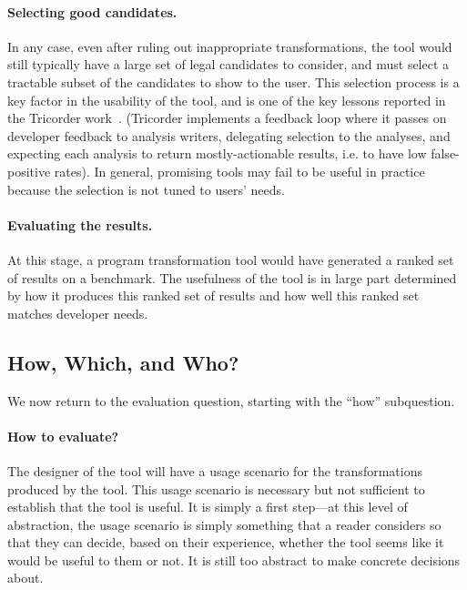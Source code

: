 \paragraph{Selecting good candidates.} In any case, even after ruling out 
inappropriate transformations, the tool would still typically have a large
set of legal candidates to consider, and must select a tractable subset of the
candidates to show to the user. This selection process is a key factor
in the usability of the tool, and is one of the key lessons reported
in the Tricorder
work~\cite{sadowski18:_lesson_build_static_analy_tools_googl}.
(Tricorder implements a feedback loop where it passes on developer feedback 
to analysis writers, delegating selection to the analyses, and
expecting each analysis to return mostly-actionable results, i.e.
to have low false-positive rates).
In general, promising tools may fail to be useful in practice because the
selection is not tuned to users' needs.

\paragraph{Evaluating the results.} At this stage, a program
transformation tool would have generated a ranked set of results on a
benchmark. The usefulness of the tool is in large part determined
by how it produces this ranked set of results and how well this ranked set
matches developer needs.

\subsection{How, Which, and Who?}
We now return to the evaluation question, starting with the ``how'' subquestion.

\paragraph{How to evaluate?} The designer of the tool will have a usage scenario for the
transformations produced by the tool. This usage scenario is necessary
but not sufficient to establish that the tool is useful. It is simply
a first step---at this level of abstraction, the usage scenario is
simply something that a reader considers so that they can decide,
based on their experience, whether the tool seems like it would be
useful to them or not.  It is still too abstract to make concrete
decisions about.

